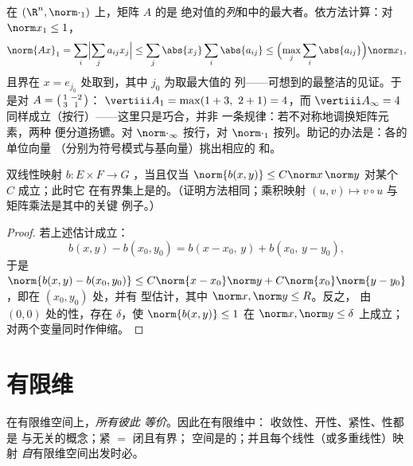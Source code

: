 \begin{example}\label{ex:b2:nvs:columnsums}
在 $(\R^n, \norm\cdot_1)$ 上，矩阵 $A$ 的是
绝对值的\emph{列}和中的最大者。依方法计算：对
$\norm x_1 \leq 1$，
\[
\norm{Ax}_1 = \sum_i\Bigl|\sum_j a_{ij}x_j\Bigr|
\leq \sum_j \abs{x_j}\sum_i\abs{a_{ij}}
\leq \Bigl(\max_j\sum_i\abs{a_{ij}}\Bigr)\norm x_1 ,
\]
且界在 $x = e_{j_0}$ 处取到，其中 $j_0$ 为取最大值的
列——可想到的最整洁的见证。于是对 $A =
\begin{psmallmatrix}1 & -2\\ 3 & 1\end{psmallmatrix}$：
$\vertiii A_1 = \max(1 + 3,\ 2 + 1) = 4$，而
$\vertiii A_\infty = 4$ 同样成立（按行）——这里只是巧合，并非
一条规律：若不对称地调换矩阵元素，两种
便分道扬镳。对 $\norm\cdot_\infty$ 按行，对
$\norm\cdot_1$ 按列。助记的办法是：各的单位向量
（分别为符号模式与基向量）挑出相应的
和。
\end{example}

\begin{proposition}[双线性映射]\label{prop:b2:nvs:bilinear}
双线性映射 $b \colon E \times F \to G$ ，当且仅当
$\norm{b(x,y)} \leq C\norm x\,\norm y$ 对某个 $C$ 成立；此时它
在有界集上是的。（证明方法相同；乘积映射
$(u, v) \mapsto v \circ u$ 与矩阵乘法是其中的关键
例子。）
\end{proposition}

\begin{proof}
若上述估计成立：
\[
b(x,y) - b(x_0,y_0) = b(x - x_0,\, y) + b(x_0,\, y - y_0),
\]
于是 $\norm{b(x,y) - b(x_0,y_0)} \leq C\norm{x - x_0}\norm y +
C\norm{x_0}\norm{y - y_0}$，即在 $(x_0, y_0)$ 处，并有
型估计，其中 $\norm x, \norm y \leq R$。反之，
由 $(0,0)$ 处的性，存在 $\delta$，使 $\norm{b(x,y)} \leq 1$ 在
$\norm x, \norm y \leq \delta$ 上成立；对两个变量同时作伸缩。
\end{proof}

\section{有限维}

\begin{theorem}[有限维空间中范数的等价性]\label{thm:b2:nvs:finitedim}
在有限维空间上，\emph{所有彼此
等价}。因此在有限维中：
收敛性、开性、紧性、性都是
与无关的概念；紧 $=$ 闭且有界；
空间是的；并且每个线性（或多重线性）映射
\emph{自}有限维空间出发时必。
\end{theorem}

